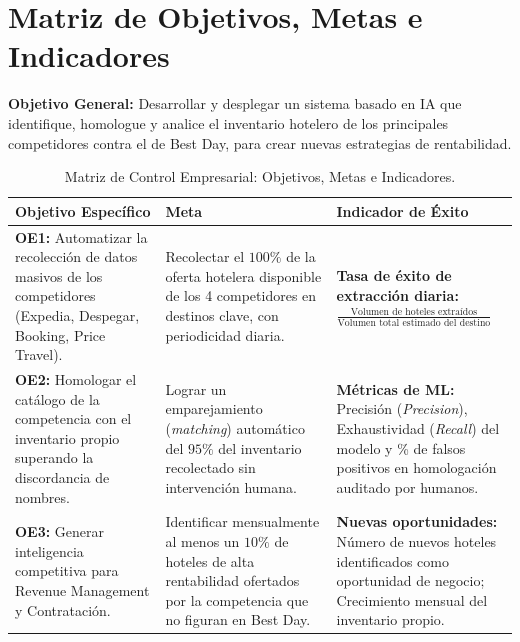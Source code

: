 \documentclass[11pt,a4paper]{article}
\begin{document}
\newpage

\section{Matriz de Objetivos, Metas e Indicadores}
\textbf{Objetivo General:} Desarrollar y desplegar un sistema basado en IA que identifique, homologue y analice el inventario hotelero de los principales competidores contra el de Best Day, para crear nuevas estrategias de rentabilidad.

\begin{table}[htbp]
\centering
\caption{Matriz de Control Empresarial: Objetivos, Metas e Indicadores.}
\vspace{0.2cm}
\begin{tabularx}{\textwidth}{p{4.2cm} p{4.2cm} X}
\toprule
\textbf{Objetivo Específico} & \textbf{Meta} & \textbf{Indicador de Éxito} \\
\midrule
\textbf{OE1:} Automatizar la recolección de datos masivos de los competidores (Expedia, Despegar, Booking, Price Travel). & Recolectar el $100\%$ de la oferta hotelera disponible de los 4 competidores en destinos clave, con periodicidad diaria. & \textbf{Tasa de éxito de extracción diaria:} \newline $\displaystyle\frac{\text{Volumen de hoteles extraídos}}{\text{Volumen total estimado del destino}}$ \\ \addlinespace
\textbf{OE2:} Homologar el catálogo de la competencia con el inventario propio superando la discordancia de nombres. & Lograr un emparejamiento (\textit{matching}) automático del $95\%$ del inventario recolectado sin intervención humana. & \textbf{Métricas de ML:} \newline Precisión (\textit{Precision}), Exhaustividad (\textit{Recall}) del modelo y \% de falsos positivos en homologación auditado por humanos. \\ \addlinespace
\textbf{OE3:} Generar inteligencia competitiva para Revenue Management y Contratación. & Identificar mensualmente al menos un $10\%$ de hoteles de alta rentabilidad ofertados por la competencia que no figuran en Best Day. & \textbf{Nuevas oportunidades:} \newline Número de nuevos hoteles identificados como oportunidad de negocio; Crecimiento mensual del inventario propio. \\
\bottomrule
\end{tabularx}
\label{tab:matriz_objetivos}
\end{table}
\end{document}
